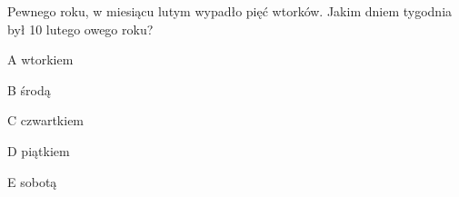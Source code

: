 \begin{tresc}
Pewnego roku, w miesiącu lutym wypadło pięć wtorków. Jakim dniem tygodnia był 10 lutego owego roku?
\end{tresc}
\begin{wariant}{A} wtorkiem \end{wariant}
\begin{wariant}{B} środą \end{wariant}
\begin{wariant}{C} czwartkiem \end{wariant}
\begin{wariant}{D} piątkiem \end{wariant}
\begin{wariant}{E} sobotą \end{wariant}
